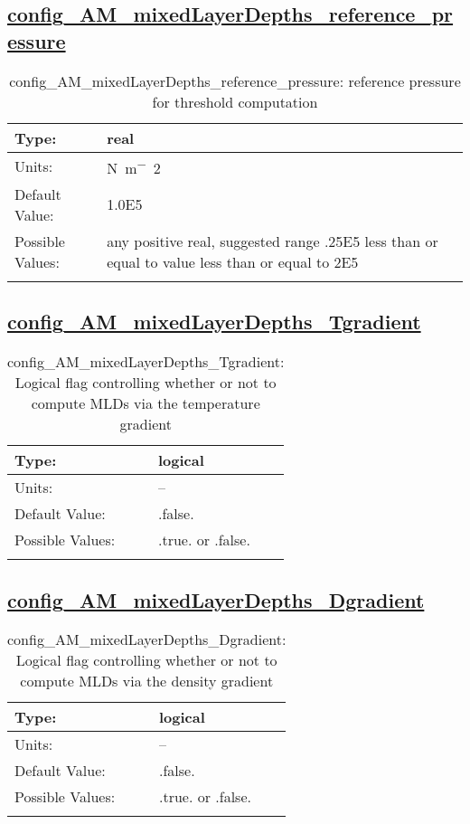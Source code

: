 \subsection[config\_AM\_mixedLayerDepths\_reference\_pressure]{\hyperref[sec:nm_tab_AM_mixedLayerDepths]{config\_AM\_mixedLayerDepths\_reference\_pressure}}
\label{subsec:nm_sec_config_AM_mixedLayerDepths_reference_pressure}
\begin{center}
\begin{longtable}{| p{2.0in} || p{4.0in} |}
    \hline
    Type: & real \\
    \hline
    Units: & \si{N.m^-2} \\
    \hline
    Default Value: & 1.0E5 \\
    \hline
    Possible Values: & any positive real, suggested range .25E5 less than or equal to value less than or equal to 2E5 \\
    \hline
    \caption{config\_AM\_mixedLayerDepths\_reference\_pressure: reference pressure for threshold computation}
\end{longtable}
\end{center}
\subsection[config\_AM\_mixedLayerDepths\_Tgradient]{\hyperref[sec:nm_tab_AM_mixedLayerDepths]{config\_AM\_mixedLayerDepths\_Tgradient}}
\label{subsec:nm_sec_config_AM_mixedLayerDepths_Tgradient}
\begin{center}
\begin{longtable}{| p{2.0in} || p{4.0in} |}
    \hline
    Type: & logical \\
    \hline
    Units: & -- \\
    \hline
    Default Value: & .false. \\
    \hline
    Possible Values: & .true. or .false. \\
    \hline
    \caption{config\_AM\_mixedLayerDepths\_Tgradient: Logical flag controlling whether or not to compute MLDs via the temperature gradient}
\end{longtable}
\end{center}
\subsection[config\_AM\_mixedLayerDepths\_Dgradient]{\hyperref[sec:nm_tab_AM_mixedLayerDepths]{config\_AM\_mixedLayerDepths\_Dgradient}}
\label{subsec:nm_sec_config_AM_mixedLayerDepths_Dgradient}
\begin{center}
\begin{longtable}{| p{2.0in} || p{4.0in} |}
    \hline
    Type: & logical \\
    \hline
    Units: & -- \\
    \hline
    Default Value: & .false. \\
    \hline
    Possible Values: & .true. or .false. \\
    \hline
    \caption{config\_AM\_mixedLayerDepths\_Dgradient: Logical flag controlling whether or not to compute MLDs via the density gradient}
\end{longtable}
\end{center}
